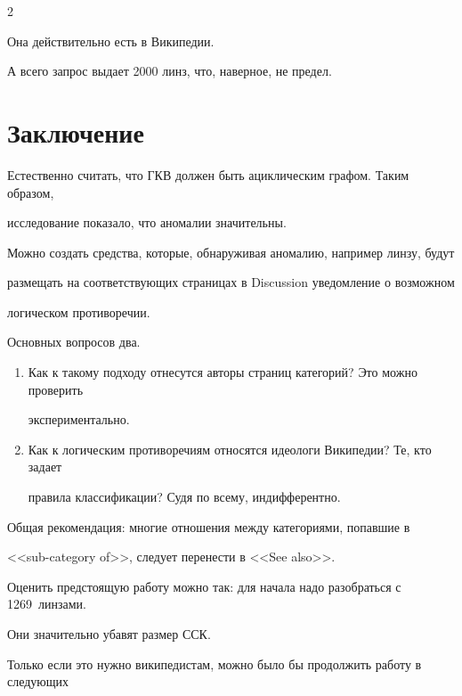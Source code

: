 \begin{multicols}{2}
   

   Она действительно есть в Википедии.

   

   А всего запрос выдает 2000 линз, что, наверное, не предел.

   

\section{Заключение}



   Естественно считать, что ГКВ должен быть ацик\-ли\-че\-ским графом. Таким образом, 

исследование показало, что аномалии значительны.

   

   Можно создать средства, которые, обнаруживая аномалию, например линзу, будут 

размещать на соответствующих страницах в Discussion уведомление о возможном 

логическом противоречии.

   

   Основных вопросов два.

   \begin{enumerate}[1.]

   \item Как к такому подходу отнесутся авторы страниц категорий? Это можно проверить 

экспериментально.

   \item Как к логическим противоречиям относятся идеологи Википедии? Те, кто задает 

правила классификации? Судя по всему, индифферентно.

   \end{enumerate}

   

   Общая рекомендация: многие отношения между категориями, попавшие в 

   <<sub-category of>>, следует перенести в <<See also>>.

   

   Оценить предстоящую работу можно так: для начала надо разобраться с 1269~линзами. 

Они значительно убавят размер ССК.

   

   Только если это нужно википедистам, можно было бы продолжить работу в следующих 


\end{multicols}

